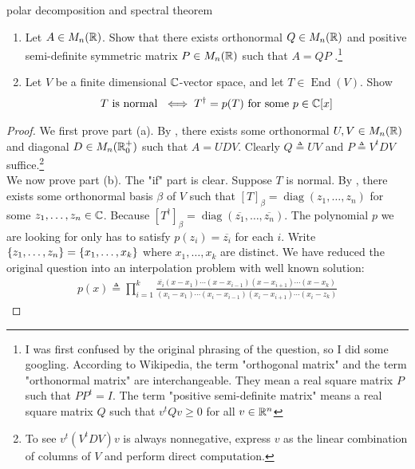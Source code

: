 \documentclass{report}
\begin{document}
\begin{question}{polar decomposition and spectral theorem}{}
\begin{enumerate}[label=(\alph*)]
  \item Let $A\in M_n(\mathbb{R})$. Show that there exists orthonormal $Q\in M_n(\mathbb{R})$ and positive semi-definite symmetric matrix $P \in M_n(\mathbb{R})$ such that $A=QP$ .\footnote{I was first confused by the original phrasing of the question, so I did some googling. According to Wikipedia, the term "orthogonal matrix" and the term "orthonormal matrix" are interchangeable. They mean a real square matrix  $P$ such that  $PP^t=I$. The term "positive semi-definite matrix" means a real square matrix $Q$ such that $v^tQv\geq 0$ for all $v \in\mathbb{R}^n$} 
  \item Let $V$ be a finite dimensional  $\mathbb{C}$-vector space, and let $T \in \operatorname{End}(V)$. Show 
\begin{align*}
T\text{ is normal }\iff  T^{\dagger }=p(T)\text{ for some }p \in \mathbb{C}[x]
\end{align*}
  \end{enumerate}  
\end{question}
\begin{proof}
  We first prove part (a). By , there exists some orthonormal $U,V \in M_n(\mathbb{R})$ and diagonal  $D \in M_n(\mathbb{R}^+_0)$ such that $A=UDV$. Clearly $Q\triangleq UV$ and $P\triangleq V^tD V$ suffice.\footnote{To see $v^t(V^tDV)v$ is always nonnegative, express $v$ as the linear combination of columns of  $V$ and perform  direct computation.} \\

We now prove part (b). The "if" part is clear. Suppose $T$ is normal. By , there exists some orthonormal basis $\beta $ of $V$ such that  $[T]_\beta  = \operatorname{diag}(z_1,\dots ,z_n)$ for some $z_1,\dots ,z_n \in\mathbb{C}$. Because $[T^{\dagger }]_\beta  = \operatorname{diag}(\overline{z_1},\dots, \overline{z_n})$. The polynomial $p$ we are looking for only has to satisfy $p(z_i)= \overline{z_i}$ for each $i$. Write $\left\{ z_1,\dots , z_n \right\}=\left\{ x_1,\dots ,x_k \right\}$ where $x_1,\dots ,x_k$ are distinct. We have reduced the original question into an interpolation problem with well known solution: 
\begin{align*}
p(x)\triangleq \prod_{i=1}^k \frac{\overline{x_i}(x-x_1)\cdots (x-x_{i-1})(x-x_{i+1})\cdots (x-x_{k})}{(x_i-x_1)\cdots (x_i- x_{i-1})(x_i-x_{i+1})\cdots (x_i-z_k)}
\end{align*}
\end{proof}
\end{document}
